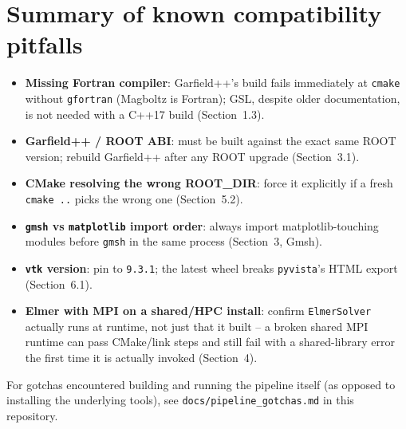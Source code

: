 \documentclass[11pt]{article}
\begin{document}
\section{Summary of known compatibility pitfalls}

\begin{itemize}
  \item \textbf{Missing Fortran compiler}: Garfield++'s build fails
    immediately at \texttt{cmake} without \texttt{gfortran} (Magboltz is
    Fortran); GSL, despite older documentation, is not needed with a
    C++17 build (Section~1.3).
  \item \textbf{Garfield++ / ROOT ABI}: must be built against the exact
    same ROOT version; rebuild Garfield++ after any ROOT upgrade
    (Section~3.1).
  \item \textbf{CMake resolving the wrong ROOT\_DIR}: force it explicitly
    if a fresh \texttt{cmake ..} picks the wrong one (Section~5.2).
  \item \textbf{\texttt{gmsh} vs \texttt{matplotlib} import order}: always
    import matplotlib-touching modules before \texttt{gmsh} in the same
    process (Section~3, Gmsh).
  \item \textbf{\texttt{vtk} version}: pin to \texttt{9.3.1}; the latest
    wheel breaks \texttt{pyvista}'s HTML export (Section~6.1).
  \item \textbf{Elmer with MPI on a shared/HPC install}: confirm
    \texttt{ElmerSolver} actually runs at runtime, not just that it built
    -- a broken shared MPI runtime can pass CMake/link steps and still
    fail with a shared-library error the first time it is actually
    invoked (Section~4).
\end{itemize}

For gotchas encountered building and running the pipeline itself (as
opposed to installing the underlying tools), see
\texttt{docs/pipeline\_gotchas.md} in this repository.
\end{document}
